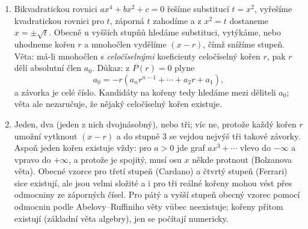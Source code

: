 \begin{enumerate}[label=\textbf{\arabic*.}, leftmargin=*, itemsep=0.8em]
  \item {}
  Bikvadratickou rovnici $ax^4 + bx^2 + c = 0$ řešíme substitucí $t = x^2$, vyřešíme kvadratickou rovnici pro $t$, záporná $t$ zahodíme a z $x^2 = t$ dostaneme $x = \pm\sqrt{t}$. Obecně u vyšších stupňů hledáme substituci, vytýkáme, nebo uhodneme kořen $r$ a mnohočlen vydělíme $(x - r)$, čímž snížíme stupeň. Věta: má-li mnohočlen s \emph{celočíselnými} koeficienty celočíselný kořen $r$, pak $r$ dělí absolutní člen $a_0$. Důkaz: z $P(r) = 0$ plyne
  \begin{equation*}
    a_0 = -r\left(a_nr^{n-1} + \cdots + a_2r + a_1\right),
  \end{equation*}
  a závorka je celé číslo. Kandidáty na kořeny tedy hledáme mezi děliteli $a_0$; věta ale nezaručuje, že nějaký celočíselný kořen existuje. 

  \item {}
  Jeden, dva (jeden z nich dvojnásobný), nebo tři; víc ne, protože každý kořen $r$ umožní vytknout $(x - r)$ a do stupně $3$ se vejdou nejvýš tři takové závorky. Aspoň jeden kořen existuje vždy: pro $a > 0$ jde graf $ax^3 + \cdots$ vlevo do $-\infty$ a vpravo do $+\infty$, a protože je spojitý, musí osu $x$ někde protnout (Bolzanova věta). Obecné vzorce pro třetí stupeň (Cardano) a čtvrtý stupeň (Ferrari) sice existují, ale jsou velmi složité a i pro tři reálné kořeny mohou vést přes odmocniny ze záporných čísel. Pro pátý a vyšší stupeň obecný vzorec pomocí odmocnin podle Abelovy--Ruffiniho věty vůbec neexistuje; kořeny přitom existují (základní věta algebry), jen se počítají numericky. 


\end{enumerate}
